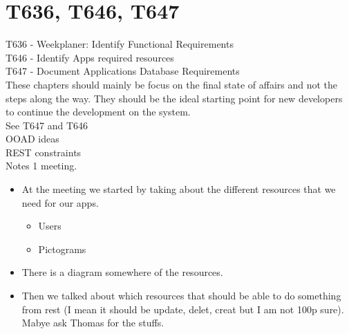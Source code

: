 \chapter{T636, T646, T647}\label{S1CS}

T636 - Weekplaner: Identify Functional Requirements\\
T646 - Identify Apps required resources\\
T647 - Document Applications Database Requirements\\


These chapters should mainly be focus on the final state of affairs and not the
steps along the way. They should be the ideal starting point for new developers
to continue the development on the system.\\


See T647 and T646\\
OOAD ideas\\
REST constraints\\

Notes 1 meeting.\\
\begin{itemize}
  \item At the meeting we started by taking about the different resources that we need
for our apps.
\begin{itemize}
  \item Users
  \item Pictograms
\end{itemize}
\item There is a diagram somewhere of the resources.
\item Then we talked about which resources that should be able to do something
from rest (I mean it should be update, delet, creat but I am not 100p sure).
Mabye ask Thomas for the stuffs.
\end{itemize}

